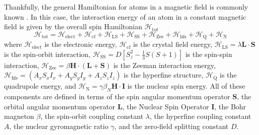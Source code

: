 \documentclass[oneside, noacknowlegments]{BYUPhys}
\begin{document}
Thankfully, the general Hamiltonian for atoms in a magnetic field is commonly known \cite{RefWorks:doc:58929c15e4b0228a29292c58} \cite{RefWorks:doc:589295bde4b0d4c09201f692}. In this case, the interaction energy of an atom in a constant magnetic field is given by the overall spin Hamiltonian $\mathcal{H}_{\text{tot}}$ \cite{RefWorks:doc:589293f5e4b0dec22aee39de} $$\mathcal{H}_{\text{tot}} = \mathcal{H}_{\text{elect}} + \mathcal{H}_{\text{cf}} + \mathcal{H}_{\text{LS}} + \mathcal{H}_{\text{SS}} + \mathcal{H}_{\text{Zee}} + \mathcal{H}_{\text{hfs}} + \mathcal{H}_{\text{Q}} + \mathcal{H}_{\text{N}}$$ where $\mathcal{H}_{\text{elect}}$ is the electronic energy, $\mathcal{H}_{\text{cf}}$ is the crystal field energy, $\mathcal{H}_{\text{LS}} = \lambda \mathbf{L} \cdot \mathbf{S}$ is the spin-orbit interaction, $\mathcal{H}_{\text{SS}} = D \left[ S_{z}^{2} - \frac{1}{3} S (S+1) \right]$ is the spin-spin interaction, $\mathcal{H}_{\text{Zee}} = \beta \mathbf{H} \cdot (\mathbf{L}+\mathbf{S})$ is the Zeeman interaction energy, $\mathcal{H}_{\text{hfs}} = \left(A_xS_xI_x + A_yS_yI_y + A_zS_zI_z\right)$ is the hyperfine structure, $\mathcal{H}_{\text{Q}}$ is the quadrupole energy, and $\mathcal{H}_{\text{N}} = \gamma \beta_{N} \mathbf{H} \cdot \mathbf{I}$ is the nuclear spin energy. All of these components are defined in terms of the spin angular momentum operator $\mathbf{S}$, the orbital angular momentum operator $\mathbf{L}$, the Nuclear Spin Operator $\mathbf{I}$, the Bohr magneton $\beta$, the spin-orbit coupling constant $\lambda$, the hyperfine coupling constant $A$, the nuclear gyromagnetic ratio $\gamma$, and the zero-field splitting constant $D$.
\end{document}
